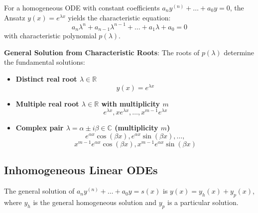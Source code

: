 \begin{lemma}
    For a homogeneous ODE with constant coefficients $a_n y^{(n)} + \dots + a_0 y = 0$, the Ansatz $y(x) = e^{\lambda x}$ yields the characteristic equation:
    $$a_n \lambda^n + a_{n-1} \lambda^{n-1} + \dots + a_1 \lambda + a_0 = 0$$
    with characteristic polynomial $p(\lambda)$.
\end{lemma}

\begin{theorem}
    \textbf{General Solution from Characteristic Roots}: The roots of $p(\lambda)$ determine the fundamental solutions:
    \begin{itemize}
        \item \textbf{Distinct real root $\lambda \in \mathbb{R}$}
        $$y(x) = e^{\lambda x}$$
        \item \textbf{Multiple real root $\lambda \in \mathbb{R}$ with multiplicity $m$}
        $$e^{\lambda x}, x e^{\lambda x}, \dots, x^{m-1} e^{\lambda x}$$
        \item \textbf{Complex pair $\lambda = \alpha \pm i\beta \in \mathbb{C}$ (multiplicity $m$)}
        $$e^{\alpha x}\cos(\beta x), e^{\alpha x}\sin(\beta x), \dots,$$
        $$x^{m-1}e^{\alpha x}\cos(\beta x), x^{m-1}e^{\alpha x}\sin(\beta x)$$
    \end{itemize}
\end{theorem}

\subsection{Inhomogeneous Linear ODEs}

\begin{lemma}
    The general solution of $a_n y^{(n)} + \dots + a_0 y = s(x)$ is $y(x) = y_h(x) + y_p(x)$, where $y_h$ is the general homogeneous solution and $y_p$ is a particular solution.
\end{lemma}

